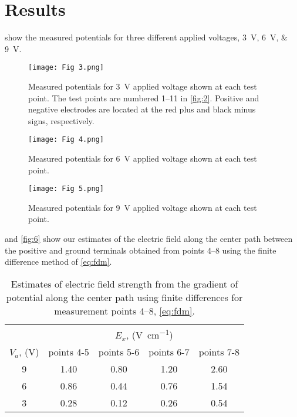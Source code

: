 ﻿\documentclass[10pt,journal,twoside]{IEEEtran}
\begin{document}
\section{Results}
 show the measured potentials for three different applied voltages, \qtylist{3;6;9}{\volt}. 
\begin{figure}
\begin{center}
%
\texttt{[image: Fig 3.png]}
\end{center}
\caption{Measured potentials for \qty{3}{\volt} applied voltage shown at each test point. The test points are numbered 1--11 in \cref{fig:2}. Positive and negative electrodes are located at the red plus and black minus signs, respectively.}
\label{fig:3}
\end{figure}
\begin{figure}
\begin{center}
%
\texttt{[image: Fig 4.png]}
\end{center}
\caption{Measured potentials for \qty{6}{\volt} applied voltage shown at each test point.}
\label{fig:4}
\end{figure}
\begin{figure}
\begin{center}
%
\texttt{[image: Fig 5.png]}
\end{center}
\caption{Measured potentials for \qty{9}{\volt} applied voltage shown at each test point.}
\label{fig:5}
\end{figure}
 and \cref{fig:6} show our estimates of the electric field along the center path between the positive and ground terminals obtained from points 4--8 using the finite difference method of \cref{eq:fdm}.  
\begin{table}
\caption{Estimates of electric field strength from the gradient of potential along the center path using finite differences for measurement points 4--8, \cref{eq:fdm}.}
\label{tab:1}
\begin{center}
\begin{tabular}{ccccc}
\toprule
 & \multicolumn{4}{c}{$E_x$, (\unit{\volt\per\centi\meter})} \\
$V_{a}$, (\unit{\volt}) & points 4-5 & points 5-6 & points 6-7 & points 7-8 \\
\midrule
9 & 1.40 & 0.80 & 1.20 & 2.60 \\
6 & 0.86 & 0.44 & 0.76 & 1.54 \\
3 & 0.28 & 0.12 & 0.26 & 0.54 \\
\bottomrule
\end{tabular}
\end{center}
\end{table}
\end{document}
